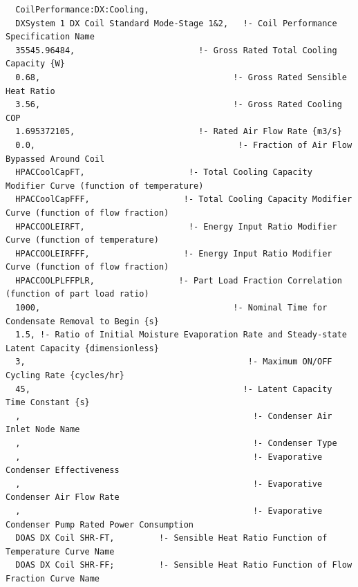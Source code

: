 \begin{lstlisting}
  CoilPerformance:DX:Cooling,
  DXSystem 1 DX Coil Standard Mode-Stage 1&2,   !- Coil Performance Specification Name
  35545.96484,                         !- Gross Rated Total Cooling Capacity {W}
  0.68,                                       !- Gross Rated Sensible Heat Ratio
  3.56,                                       !- Gross Rated Cooling COP
  1.695372105,                         !- Rated Air Flow Rate {m3/s}
  0.0,                                         !- Fraction of Air Flow Bypassed Around Coil
  HPACCoolCapFT,                     !- Total Cooling Capacity Modifier Curve (function of temperature)
  HPACCoolCapFFF,                   !- Total Cooling Capacity Modifier Curve (function of flow fraction)
  HPACCOOLEIRFT,                     !- Energy Input Ratio Modifier Curve (function of temperature)
  HPACCOOLEIRFFF,                   !- Energy Input Ratio Modifier Curve (function of flow fraction)
  HPACCOOLPLFFPLR,                 !- Part Load Fraction Correlation (function of part load ratio)
  1000,                                       !- Nominal Time for Condensate Removal to Begin {s}
  1.5, !- Ratio of Initial Moisture Evaporation Rate and Steady-state Latent Capacity {dimensionless}
  3,                                             !- Maximum ON/OFF Cycling Rate {cycles/hr}
  45,                                           !- Latent Capacity Time Constant {s}
  ,                                               !- Condenser Air Inlet Node Name
  ,                                               !- Condenser Type
  ,                                               !- Evaporative Condenser Effectiveness
  ,                                               !- Evaporative Condenser Air Flow Rate
  ,                                               !- Evaporative Condenser Pump Rated Power Consumption
  DOAS DX Coil SHR-FT,         !- Sensible Heat Ratio Function of Temperature Curve Name
  DOAS DX Coil SHR-FF;         !- Sensible Heat Ratio Function of Flow Fraction Curve Name



\end{lstlisting}

